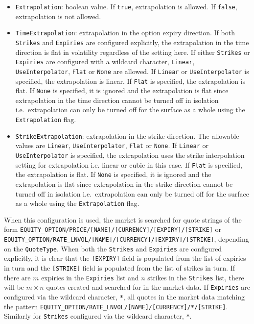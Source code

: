 \documentclass[12pt, a4paper]{article}
\begin{document}
{{\begin{itemize}
\item
\lstinline!Extrapolation!: boolean value. If \lstinline!true!, extrapolation is allowed. If \lstinline!false!, extrapolation is not allowed.

\item
\lstinline!TimeExtrapolation!: extrapolation in the option expiry direction. If both \lstinline!Strikes! and \lstinline!Expiries! are configured explicitly, the extrapolation in the time direction is flat in volatility regardless of the setting here. If either \lstinline!Strikes! or \lstinline!Expiries! are configured with a wildcard character, \lstinline!Linear!, \lstinline!UseInterpolator!, \lstinline!Flat! or \lstinline!None! are allowed. If \lstinline!Linear! or \lstinline!UseInterpolator! is specified, the extrapolation is linear. If \lstinline!Flat! is specified, the extrapolation is flat. If \lstinline!None! is specified, it is ignored and the extrapolation is flat since extrapolation in the time direction cannot be turned off in isolation i.e.\ extrapolation can only be turned off for the surface as a whole using the \lstinline!Extrapolation! flag.

\item
\lstinline!StrikeExtrapolation!: extrapolation in the strike direction. The allowable values are \lstinline!Linear!, \lstinline!UseInterpolator!, \lstinline!Flat! or \lstinline!None!. If \lstinline!Linear! or \lstinline!UseInterpolator! is specified, the extrapolation uses the strike interpolation setting for extrapolation i.e. linear or cubic in this case. If \lstinline!Flat! is specified, the extrapolation is flat. If \lstinline!None! is specified, it is ignored and the extrapolation is flat since extrapolation in the strike direction cannot be turned off in isolation i.e.\ extrapolation can only be turned off for the surface as a whole using the \lstinline!Extrapolation! flag.

\end{itemize}

When this configuration is used, the market is searched for quote strings of the form \lstinline!EQUITY_OPTION/PRICE/[NAME]/[CURRENCY]/[EXPIRY]/[STRIKE]! or \lstinline!EQUITY_OPTION/RATE_LNVOL/[NAME]/[CURRENCY]/[EXPIRY]/[STRIKE]!, depending on the \lstinline!QuoteType!. When both the \lstinline!Strikes! and \lstinline!Expiries! are configured explicitly, it is clear that the \lstinline![EXPIRY]! field is populated from the list of expiries in turn and the \lstinline![STRIKE]! field is populated from the list of strikes in turn. If there are $m$ expiries in the \lstinline!Expiries! list and $n$ strikes in the \lstinline!Strikes! list, there will be $m \times n$ quotes created and searched for in the market data. If \lstinline!Expiries! are configured via the wildcard character, \lstinline!*!, all quotes in the market data matching the pattern \lstinline!EQUITY_OPTION/RATE_LNVOL/[NAME]/[CURRENCY]/*/[STRIKE]!. Similarly for \lstinline!Strikes! configured via the wildcard character, \lstinline!*!.

}}
\end{document}

